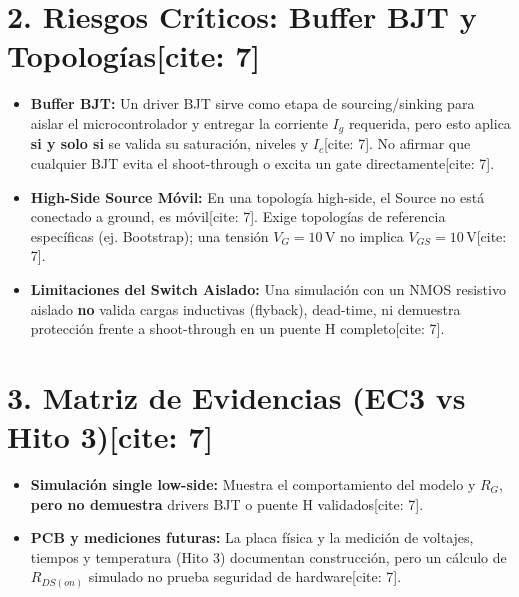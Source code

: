\documentclass[11pt, a4paper]{article}
\begin{document}
\section*{2. Riesgos Críticos: Buffer BJT y Topologías[cite: 7]}
\begin{itemize}
    \item \textbf{Buffer BJT:} Un driver BJT sirve como etapa de sourcing/sinking para aislar el microcontrolador y entregar la corriente $I_g$ requerida, pero esto aplica \textbf{si y solo si} se valida su saturación, niveles y $I_c$[cite: 7]. No afirmar que cualquier BJT evita el shoot-through o excita un gate directamente[cite: 7].
    \item \textbf{High-Side Source Móvil:} En una topología high-side, el Source no está conectado a ground, es móvil[cite: 7]. Exige topologías de referencia específicas (ej. Bootstrap); una tensión $V_G = 10\,\text{V}$ no implica $V_{GS}=10\,\text{V}$[cite: 7].
    \item \textbf{Limitaciones del Switch Aislado:} Una simulación con un NMOS resistivo aislado \textbf{no} valida cargas inductivas (flyback), dead-time, ni demuestra protección frente a shoot-through en un puente H completo[cite: 7].
\end{itemize}

\section*{3. Matriz de Evidencias (EC3 vs Hito 3)[cite: 7]}
\begin{itemize}
    \item \textbf{Simulación single low-side:} Muestra el comportamiento del modelo y $R_G$, \textbf{pero no demuestra} drivers BJT o puente H validados[cite: 7].
    \item \textbf{PCB y mediciones futuras:} La placa física y la medición de voltajes, tiempos y temperatura (Hito 3) documentan construcción, pero un cálculo de $R_{DS(on)}$ simulado no prueba seguridad de hardware[cite: 7].
\end{itemize}
\end{document}
